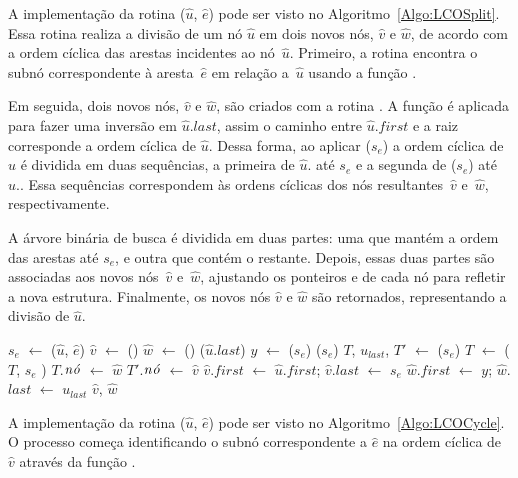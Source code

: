 A implementação da rotina \LCOSplit($\hat u$, $\hat e$) pode ser visto no Algoritmo~\ref{Algo:LCOSplit}.
Essa rotina realiza a divisão de um nó $\hat u$ em dois novos nós, $\hat v$ e $\hat w$, de acordo com a ordem cíclica das arestas incidentes ao nó~$\hat u$.
Primeiro, a rotina encontra o subnó correspondente à aresta~$\hat e$ em relação a~$\hat u$ usando a função \LCOFindSubNode.

Em seguida, dois novos nós, $\hat v$ e $\hat w$, são criados com a rotina \LCOMakeNode.
A função \linkcutEvert{} é aplicada para fazer uma inversão em $\hat u$.$last$, assim o caminho entre $\hat u$.$first$ e a raiz corresponde a ordem cíclica de $\hat u$.
Dessa forma, ao aplicar \linkcutDelEdge($s_e$) a ordem cíclica de~$\hat u$ é dividida em duas sequências, a primeira de $\hat u$. até $s_e$ e a segunda de \linkcutParent($s_e$) até~$\hat u$..
Essa sequências correspondem às ordens cíclicas dos nós resultantes~$\hat v$ e~$\hat w$, respectivamente.

A árvore binária de busca é dividida em duas partes: uma que mantém a ordem das arestas até $s_e$, e outra que contém o restante.
Depois, essas duas partes são associadas aos novos nós~$\hat v$ e~$\hat w$, ajustando os ponteiros  e  de cada nó para refletir a nova estrutura.
Finalmente, os novos nós $\hat v$ e $\hat w$ são retornados, representando a divisão de $\hat u$.

\begin{algorithm}[htb]
\caption{\LCOSplit($\hat u$, $\hat e$)}
\label{Algo:LCOSplit}
\begin{algorithmic}[1]
\State $s_e$ $\gets$ \LCOFindSubNode($\hat u$, $\hat e$)
\State $\hat v$ $\gets$ \LCOMakeNode()
\State $\hat w$ $\gets$ \LCOMakeNode()
\State \linkcutEvert($\hat u$.$last$)
\State $y$ $\gets$ \linkcutParent($s_e$)
\State \linkcutDelEdge($s_e$)
\State $T$, $u_{last}$, $T'$ $\gets$ \treapSplit($s_e$)
\State $T$ $\gets$ \treapJoin($T$, $s_e$  )
\State $T$.$\mathit{n\acute{o}}$ $\gets$ $\hat w$
\State $T'$.$\mathit{n\acute{o}}$ $\gets$ $\hat v$
\State $\hat v$.$first$ $\gets$ $\hat u$.$first$; $\hat v$.$last$ $\gets$ $s_e$
\State $\hat w$.$first$ $\gets$ $y$; $\hat w$.$last$ $\gets$ $u_{last}$
\State \Return $\hat v$, $\hat w$
\end{algorithmic}
\end{algorithm}


A implementação da rotina \LCOCycle($\hat u$, $\hat e$) pode ser visto no Algoritmo~\ref{Algo:LCOCycle}.
O processo começa identificando o subnó correspondente a $\hat e$ na ordem cíclica de~$\hat v$ através da função \LCOFindSubNode.

